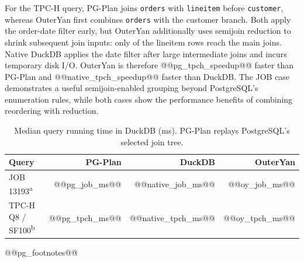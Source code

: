 For the TPC-H query, PG-Plan joins \texttt{orders} with \texttt{lineitem} before \texttt{customer}, whereas OuterYan first combines \texttt{orders} with the customer branch. Both apply the order-date filter early, but OuterYan additionally uses semijoin reduction to shrink subsequent join inputs: only  of the  lineitem rows reach the main joins. Native DuckDB applies the date filter after large intermediate joins and incurs temporary disk I/O. OuterYan is therefore @@pg_tpch_speedup@@ faster than PG-Plan and @@native_tpch_speedup@@ faster than DuckDB. The JOB case demonstrates a useful semijoin-enabled grouping beyond PostgreSQL's enumeration rules, while both cases show the performance benefits of combining reordering with reduction.

\begin{table}[t]
  \centering
  \small
  \setlength{\tabcolsep}{5pt}
  \caption{Median query running time in DuckDB (ms). PG-Plan replays PostgreSQL's selected join tree.}
  \label{tab:pgplan-runtime}
  \begin{tabular}{lrrr}
    \toprule
    Query & PG-Plan & DuckDB & OuterYan \\
    \midrule
    JOB 13193\textsuperscript{a}
      & @@pg_job_ms@@ & @@native_job_ms@@ & @@oy_job_ms@@ \\
    TPC-H Q8 / SF100\textsuperscript{b}
      & @@pg_tpch_ms@@ & @@native_tpch_ms@@ & @@oy_tpch_ms@@ \\
    \bottomrule
  \end{tabular}
  \par\smallskip
  \begin{minipage}{\linewidth}\footnotesize
  @@pg_footnotes@@
  \end{minipage}
\end{table}

